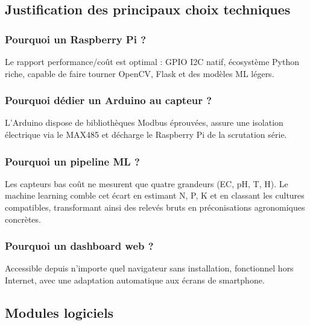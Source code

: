\documentclass[a4paper,12pt,openany,titlepage]{scrartcl}
\begin{document}
\subsection{Justification des principaux choix techniques}

\subsubsection{Pourquoi un Raspberry Pi ?}
Le rapport performance/coût est optimal : GPIO I2C natif, écosystème Python riche, capable de faire tourner OpenCV, Flask et des modèles ML légers.

\subsubsection{Pourquoi dédier un Arduino au capteur ?}
L’Arduino dispose de bibliothèques Modbus éprouvées, assure une isolation électrique via le MAX485 et décharge le Raspberry Pi de la scrutation série.

\subsubsection{Pourquoi un pipeline ML ?}
Les capteurs bas coût ne mesurent que quatre grandeurs (EC, pH, T, H). Le machine learning comble cet écart en estimant N, P, K et en classant les cultures compatibles, transformant ainsi des relevés bruts en préconisations agronomiques concrètes.

\subsubsection{Pourquoi un dashboard web ?}
Accessible depuis n’importe quel navigateur sans installation, fonctionnel hors Internet, avec une adaptation automatique aux écrans de smartphone.

\subsection{Modules logiciels}
\end{document}
